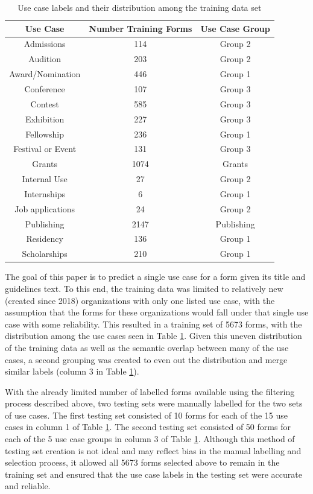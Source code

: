 \documentclass{article}
\begin{document}
\begin{table}[h]
    \centering
    \begin{tabular}{c|c|c}
    \hline
         Use Case & Number Training Forms & Use Case Group \\
    \hline
         Admissions & 114 & Group 2 \\
         Audition & 203 & Group 2 \\
         Award/Nomination & 446 & Group 1 \\
         Conference & 107 & Group 3\\
         Contest & 585 & Group 3\\
         Exhibition & 227 & Group 3\\
         Fellowship & 236 & Group 1\\
         Festival or Event & 131 & Group 3\\
         Grants & 1074 & Grants\\
         Internal Use & 27 & Group 2\\
         Internships & 6 & Group 1\\
         Job applications & 24 & Group 2\\
         Publishing & 2147 & Publishing\\
         Residency & 136 & Group 1\\
         Scholarships & 210 & Group 1\\
    \end{tabular}
    \caption{Use case labels and their distribution among the training data set}
    \label{tab:ucCounts}
\end{table}

The goal of this paper is to predict a single use case for a form given its title and guidelines text. To this end, the training data was limited to relatively new (created since 2018) organizations with only one listed use case, with the assumption that the forms for these organizations would fall under that single use case with some reliability. This resulted in a training set of 5673 forms, with the distribution among the use cases seen in Table \ref{tab:ucCounts}. Given this uneven distribution of the training data as well as the semantic overlap between many of the use cases, a second grouping was created to even out the distribution and merge similar labels (column 3 in Table \ref{tab:ucCounts}).

With the already limited number of labelled forms available using the filtering process described above, two testing sets were manually labelled for the two sets of use cases. The first testing set consisted of 10 forms for each of the 15 use cases in column 1 of Table \ref{tab:ucCounts}. The second testing set consisted of 50 forms for each of the 5 use case groups in column 3 of Table \ref{tab:ucCounts}. Although this method of testing set creation is not ideal and may reflect bias in the manual labelling and selection process, it allowed all 5673 forms selected above to remain in the training set and ensured that the use case labels in the testing set were accurate and reliable.
\end{document}
